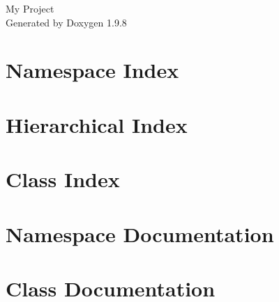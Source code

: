 \documentclass[twoside]{book}
\newcommand{\+}{\discretionary{\mbox{\scriptsize$\hookleftarrow$}}{}{}}
\newcommand{\clearemptydoublepage}{%
    \newpage{\pagestyle{empty}\cleardoublepage}%
  }
\begin{document}
  \raggedbottom
    \hypersetup{pageanchor=false,
                bookmarksnumbered=true,
                pdfencoding=unicode
               }
  \begin{titlepage}
  \vspace*{7cm}
  \begin{center}%
  {\Large My Project}\\
  \vspace*{1cm}
  {\large Generated by Doxygen 1.9.8}\\
  \end{center}
  \end{titlepage}
  \clearemptydoublepage
  \tableofcontents
  \clearemptydoublepage
  \hypersetup{pageanchor=true}
\chapter{Namespace Index}

\chapter{Hierarchical Index}

\chapter{Class Index}

\chapter{Namespace Documentation}

\chapter{Class Documentation}



  \backmatter
  \newpage
  \clearemptydoublepage
  \printindex
\end{document}
